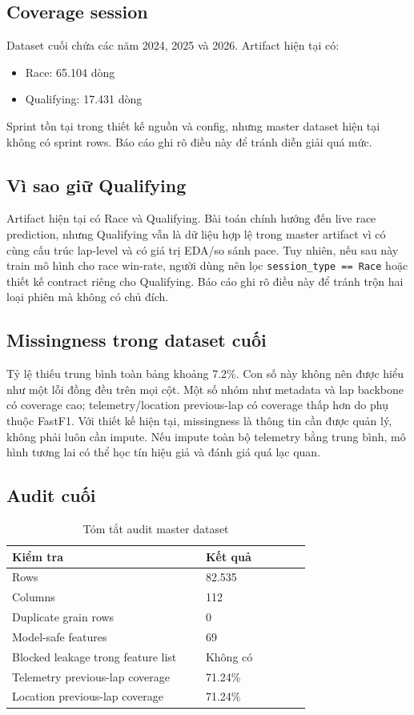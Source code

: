 \documentclass[conference]{IEEEtran}
\begin{document}
\subsection{Coverage session}
Dataset cuối chứa các năm 2024, 2025 và 2026. Artifact hiện tại có:

\begin{itemize}
    \item Race: 65.104 dòng
    \item Qualifying: 17.431 dòng
\end{itemize}

Sprint tồn tại trong thiết kế nguồn và config, nhưng master dataset hiện tại không có sprint rows. Báo cáo ghi rõ điều này để tránh diễn giải quá mức.

\subsection{Vì sao giữ Qualifying}
Artifact hiện tại có Race và Qualifying. Bài toán chính hướng đến live race prediction, nhưng Qualifying vẫn là dữ liệu hợp lệ trong master artifact vì có cùng cấu trúc lap-level và có giá trị EDA/so sánh pace. Tuy nhiên, nếu sau này train mô hình cho race win-rate, người dùng nên lọc \texttt{session\_type == Race} hoặc thiết kế contract riêng cho Qualifying. Báo cáo ghi rõ điều này để tránh trộn hai loại phiên mà không có chủ đích.

\subsection{Missingness trong dataset cuối}
Tỷ lệ thiếu trung bình toàn bảng khoảng 7.2\%. Con số này không nên được hiểu như một lỗi đồng đều trên mọi cột. Một số nhóm như metadata và lap backbone có coverage cao; telemetry/location previous-lap có coverage thấp hơn do phụ thuộc FastF1. Với thiết kế hiện tại, missingness là thông tin cần được quản lý, không phải luôn cần impute. Nếu impute toàn bộ telemetry bằng trung bình, mô hình tương lai có thể học tín hiệu giả và đánh giá quá lạc quan.

\subsection{Audit cuối}

\begin{table}[htbp]
\caption{Tóm tắt audit master dataset}
\label{tab:audit}
\centering
\begin{tabular}{p{0.48\linewidth}p{0.26\linewidth}}
\toprule
Kiểm tra & Kết quả \\
\midrule
Rows & 82.535 \\
Columns & 112 \\
Duplicate grain rows & 0 \\
Model-safe features & 69 \\
Blocked leakage trong feature list & Không có \\
Telemetry previous-lap coverage & 71.24\% \\
Location previous-lap coverage & 71.24\% \\
\bottomrule
\end{tabular}
\end{table}
\end{document}

